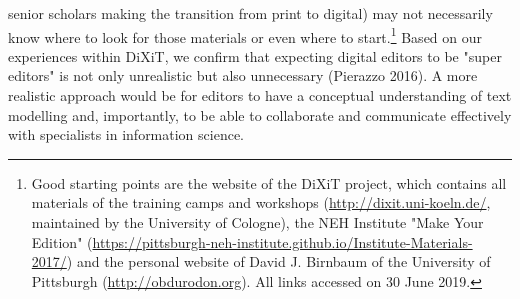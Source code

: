 \begin{paper}
senior scholars making the transition from print to digital) may not
necessarily know where to look for those materials or even where to
start.\footnote{Good starting points are the website of the DiXiT
  project, which contains all materials of the training camps and
  workshops
  (\href{http://dixit.uni-koeln.de/}{{http://dixit.uni-koeln.de/}},
  maintained by the University of Cologne), the NEH Institute "Make Your
  Edition"
  (\href{https://pittsburgh-neh-institute.github.io/Institute-Materials-2017/}{{https://pittsburgh-neh-institute.github.io/Institute-Materials-2017/}})
  and the personal website of David J. Birnbaum of the University of
  Pittsburgh (\href{http://obdurodon.org/}{{http://obdurodon.org}}). All
  links accessed on 30 June 2019.} Based on our experiences within
DiXiT, we confirm that expecting digital editors to be "super editors"
is not only unrealistic but also unnecessary (Pierazzo 2016). A more
realistic approach would be for editors to have a conceptual
understanding of text modelling and, importantly, to be able to
collaborate and communicate effectively with specialists in information
science.


\end{paper}
